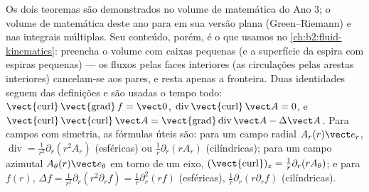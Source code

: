 \begin{remark}\label{rem:b2:maxwell-equations:whyadmitted}
Os dois teoremas são demonstrados no volume de matemática do Ano 3; o
volume de matemática deste ano para em sua versão plana
(Green--Riemann) e nas integrais múltiplas. Seu conteúdo, porém, é
o que usamos no \cref{ch:b2:fluid-kinematics}: preencha o volume com
caixas pequenas (e a superfície da espira com espiras pequenas) --- os fluxos
pelas faces interiores (as circulações pelas arestas interiores)
cancelam-se aos pares, e resta apenas a fronteira. Duas identidades
seguem das definições e são usadas o tempo todo:
$\operatorname{\vect{curl}}\operatorname{\vect{grad}}f = \vect 0$,
$\operatorname{div}\operatorname{\vect{curl}}\vect A = 0$, e
$\operatorname{\vect{curl}}\operatorname{\vect{curl}}\vect A = \operatorname{\vect{grad}}
\operatorname{div}\vect A - \Delta\vect A$. Para campos com simetria, as
fórmulas úteis são: para um campo radial $A_r(r)\vect e_r$, $\operatorname{div}
= \frac1{r^2}\partial_r(r^2A_r)$ (esféricas) ou $\frac1r\partial_r(rA_r)$
(cilíndricas); para um campo azimutal $A_\theta(r)\vect e_\theta$ em torno de um
eixo, $(\operatorname{\vect{curl}})_z = \frac1r\partial_r(rA_\theta)$; e para $f(r)$,
$\Delta f = \frac1{r^2}\partial_r(r^2\partial_rf) = \frac1r\partial_r^2(rf)$ (esféricas),
$\frac1r\partial_r(r\partial_rf)$ (cilíndricas).
\end{remark}

